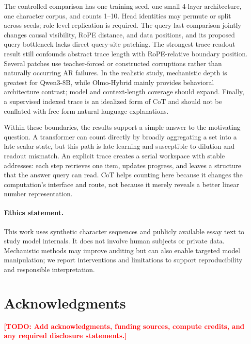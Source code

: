 \documentclass[11pt]{article}
\newcommand{\todo}[1]{\textcolor{red}{\textbf{[TODO: #1]}}}
\begin{document}
The controlled comparison has one training seed, one small 4-layer architecture, one character corpus, and counts 1--10. Head identities may permute or split across seeds; role-level replication is required. The query-last comparison jointly changes causal visibility, RoPE distance, and data positions, and its proposed query bottleneck lacks direct query-site patching. The strongest trace readout result still confounds abstract trace length with RoPE-relative boundary position. Several patches use teacher-forced or constructed corruptions rather than naturally occurring AR failures. In the realistic study, mechanistic depth is greatest for Qwen3-8B, while Olmo-Hybrid mainly provides behavioral architecture contrast; model and context-length coverage should expand. Finally, a supervised indexed trace is an idealized form of CoT and should not be conflated with free-form natural-language explanations.

Within these boundaries, the results support a simple answer to the motivating question. A transformer can count directly by broadly aggregating a set into a late scalar state, but this path is late-learning and susceptible to dilution and readout mismatch. An explicit trace creates a serial workspace with stable addresses: each step retrieves one item, updates progress, and leaves a structure that the answer query can read. CoT helps counting here because it changes the computation's interface and route, not because it merely reveals a better linear number representation.

\paragraph{Ethics statement.}
This work uses synthetic character sequences and publicly available essay text to study model internals. It does not involve human subjects or private data. Mechanistic methods may improve auditing but can also enable targeted model manipulation; we report interventions and limitations to support reproducibility and responsible interpretation.

\section*{Acknowledgments}
\todo{Add acknowledgments, funding sources, compute credits, and any required disclosure statements.}




\appendix
\end{document}
